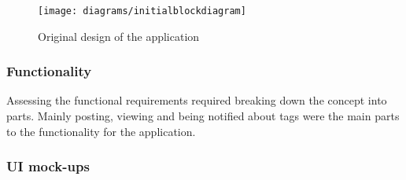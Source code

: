 \begin{figure}[H]
    \centering
    \texttt{[image: diagrams/initialblockdiagram]}
    \caption{Original design of the application}
    \label{fig:apex_block_diagram_image}
\end{figure} 

\subsubsection*{Functionality}

Assessing the functional requirements required breaking down the concept into parts. Mainly posting, viewing and being notified about tags were the main parts to the functionality for the application.\\


\subsubsection*{UI mock-ups}

